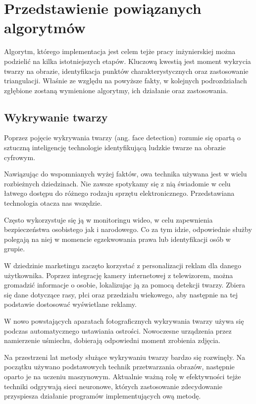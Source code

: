 \chapter{Przedstawienie powiązanych algorytmów}
\label{cha:analizaTeoretycznaProblemu}
Algorytm, którego implementacja jest celem tejże pracy inżynierskiej można podzielić na kilka istotniejszych etapów. Kluczową kwestią jest moment wykrycia twarzy na obrazie, identyfikacja punktów charakterystycznych oraz zastosowanie triangulacji. Właśnie ze względu na  powyższe fakty, w kolejnych podrozdziałach zgłębione zostaną wymienione algorytmy, ich działanie oraz zastosowania. 

\section{Wykrywanie twarzy}
Poprzez pojęcie wykrywania twarzy (ang. face detection) \cite{fDetection} rozumie się opartą o sztuczną inteligencję technologie identyfikującą ludzkie twarze na obrazie cyfrowym. 

Nawiązując do wspomnianych wyżej faktów, owa technika używana jest w wielu rozbieżnych dziedzinach. Nie zawsze spotykamy się z nią świadomie w celu łatwego dostępu do różnego rodzaju sprzętu elektronicznego. Przedstawiana technologia otacza nas wszędzie.

Często wykorzystuje się ją w monitoringu wideo, w celu zapewnienia bezpieczeństwa osobistego jak i narodowego. Co za tym idzie, odpowiednie służby polegają na niej w momencie egzekwowania prawa lub identyfikacji osób w grupie. 

W dziedzinie marketingu zaczęto korzystać z personalizacji reklam dla danego użytkownika. Poprzez integrację kamery internetowej z telewizorem, można gromadzić informacje o osobie, lokalizując ją za pomocą detekcji twarzy. Zbiera się dane dotyczące rasy, płci oraz przedziału wiekowego, aby następnie na tej podstawie dostosować wyświetlane reklamy.

W nowo powstających aparatach fotograficznych wykrywania twarzy używa się podczas automatycznego ustawiania ostrości. Nowoczesne urządzenia przez namierzenie uśmiechu, dobierają odpowiedni moment zrobienia zdjęcia. \cite{fDetection2}

Na przestrzeni lat metody służące wykrywaniu twarzy bardzo się rozwinęły. Na początku używano podstawowych technik przetwarzania obrazów, następnie oparto je na uczeniu maszynowym. Aktualnie ważną rolę w efektywności tejże techniki odgrywają sieci neuronowe, których zastosowanie zdecydowanie przyspiesza działanie programów implementujących ową metodę.

